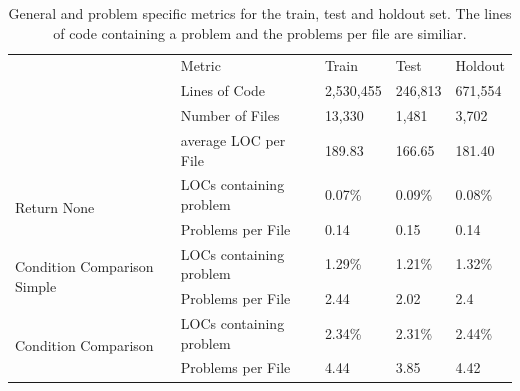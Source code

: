 \begin{table}[]
    \tabcolsep=0.11cm
    \begin{tabularx}{\textwidth}{@{}llXXX@{}}
        \toprule
    \multirow{4}{*}{}                            & Metric                  & Train & Test & Holdout \\ \cmidrule(l){2-5} 
                                                 & Lines of Code           & 2,530,455 & 246,813 & 671,554 \\
                                                 & Number of Files         & 13,330  &  1,481 & 3,702   \\
                                                 & average LOC per File    & 189.83  & 166.65  & 181.40     \\ \midrule
    \multirow{2}{*}{Return None}                 & LOCs containing problem & 0.07\%  &  0.09\% & 0.08\%  \\
                                                 & Problems per File       & 0.14    & 0.15  & 0.14    \\ \midrule
    \multirow{2}{*}{Condition Comparison Simple} & LOCs containing problem & 1.29\%  &  1.21\%  & 1.32\%  \\
                                                 & Problems per File       & 2.44    & 2.02 & 2.4    \\ \midrule
    \multirow{2}{*}{Condition Comparison}        & LOCs containing problem & 2.34\%  & 2.31\%  & 2.44\%  \\
                                                 & Problems per File       & 4.44    & 3.85  & 4.42    \\ \bottomrule
    \end{tabularx}
    \caption{General and problem specific metrics for the train, test and holdout set. The lines of code containing a problem and the problems per file are similiar.}
    \label{tab:general_data_distribution}
\end{table}

